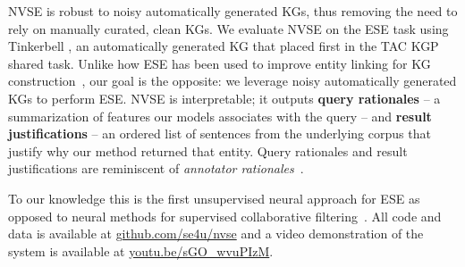 \documentclass[a4paper]{article}
\newcommand{\figref}[1]{Figure~\ref{#1}}
\newcommand{\er}{ESE\xspace}
\newcommand{\erLong}{Entity Set Expansion\xspace}
\newcommand{\nvge}{NVSE\xspace}
\newcommand{\mycite}[1]{\cite{#1}}%
\newcommand{\mynewcite}[1]{\cite{#1}}%
\begin{document}
\nvge %
is robust to noisy automatically generated KGs, thus removing the need to rely on manually curated, clean KGs.
We evaluate \nvge %
on the \er %
task using Tinkerbell \mycite{tinkerbell2017Tac},
an automatically generated KG that placed first in the TAC KGP shared
task. 
Unlike how ESE has been used to improve entity linking for KG construction~\mycite{gottipati2011linking},
our goal is the opposite: %
we leverage noisy automatically generated KGs to perform ESE. %
\nvge is interpretable; %
it outputs \textbf{query rationales} -- a summarization of features
our models associates with the query --
and \textbf{result justifications} -- an ordered list of sentences 
from the underlying corpus
that justify why
our method returned that entity. Query rationales and result justifications are
reminiscent of \textit{annotator rationales}~\mycite{zaidan-eisner-piatko-2008:nips}. %


 To our knowledge this is the first unsupervised
 neural approach for %
 \er as opposed to neural methods for supervised collaborative filtering~\mycite{lee2017augmented}. %
 All code and data is available at \url{github.com/se4u/nvse} and a video demonstration of the system is available at \url{youtu.be/sGO_wvuPIzM}.


\end{document}
